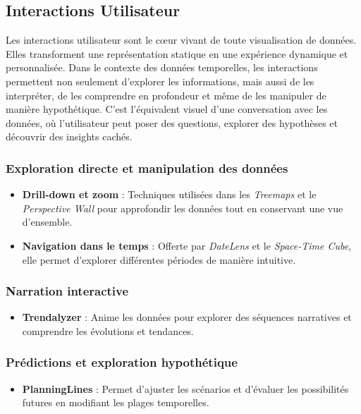 \documentclass[runningheads]{llncs}
\begin{document}
\subsection{Interactions Utilisateur}
Les interactions utilisateur sont le cœur vivant de toute visualisation de données. Elles transforment une représentation statique en une expérience dynamique et personnalisée. Dans le contexte des données temporelles, les interactions permettent non seulement d'explorer les informations, mais aussi de les interpréter, de les comprendre en profondeur et même de les manipuler de manière hypothétique. C'est l'équivalent visuel d'une conversation avec les données, où l'utilisateur peut poser des questions, explorer des hypothèses et découvrir des insights cachés.
\subsubsection{Exploration directe et manipulation des données}
\begin{itemize}
    \item \textbf{Drill-down et zoom} : Techniques utilisées dans les \emph{Treemaps} et le \emph{Perspective Wall} pour approfondir les données tout en conservant une vue d'ensemble.
    \item \textbf{Navigation dans le temps} : Offerte par \emph{DateLens} et le \emph{Space-Time Cube}, elle permet d'explorer différentes périodes de manière intuitive.
\end{itemize}

\subsubsection{Narration interactive}
\begin{itemize}
    \item \textbf{Trendalyzer} : Anime les données pour explorer des séquences narratives et comprendre les évolutions et tendances.
\end{itemize}

\subsubsection{Prédictions et exploration hypothétique}
\begin{itemize}
    \item \textbf{PlanningLines} : Permet d'ajuster les scénarios et d'évaluer les possibilités futures en modifiant les plages temporelles.
\end{itemize}
\end{document}
